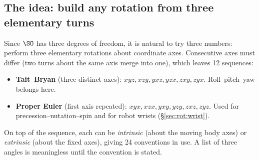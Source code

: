 \subsection{The idea: build any rotation from three elementary turns}\label{sec:rot:idea-build-any}
Since $\SO$ has three degrees of freedom, it is natural to try three numbers: perform three elementary rotations about coordinate axes. Consecutive axes must differ (two turns about the same axis merge into one), which leaves 12 sequences:
\begin{itemize}
\item \textbf{Tait--Bryan} (three distinct axes): $xyz, xzy, yxz, yzx, zxy, zyx$. Roll--pitch--yaw belongs here.
\item \textbf{Proper Euler} (first axis repeated): $xyx, xzx, yxy, yzy, zxz, zyz$. Used for precession--nutation--spin and for robot wrists (\S\ref{sec:rot:wrist}).
\end{itemize}
On top of the sequence, each can be \emph{intrinsic} (about the moving body axes) or \emph{extrinsic} (about the fixed axes), giving 24 conventions in use. A list of three angles is meaningless until the convention is stated.
